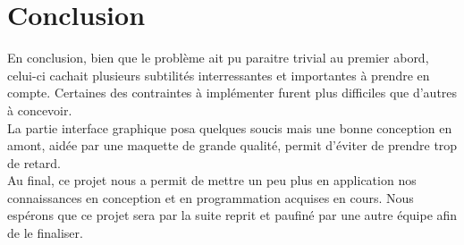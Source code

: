 \documentclass[final, noposter]{polytech/polytech}
\begin{document}
\chapter{Conclusion}
	En conclusion, bien que le problème ait pu paraitre trivial au premier abord, celui-ci cachait plusieurs subtilités interressantes et importantes à prendre en compte. Certaines des contraintes à implémenter furent plus difficiles que d'autres à concevoir. \\
	La partie interface graphique posa quelques soucis mais une bonne conception en amont, aidée par une maquette de grande qualité, permit d'éviter de prendre trop de retard. \\
	Au final, ce projet nous a permit de mettre un peu plus en application nos connaissances en conception et en programmation acquises en cours. Nous espérons que ce projet sera par la suite reprit et paufiné par une autre équipe afin de le finaliser.
\end{document}
